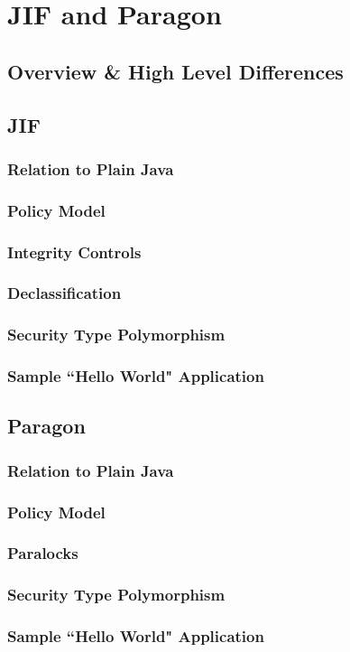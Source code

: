 \chapter{JIF and Paragon} \label{intro_to_jif_para}

\section{Overview \& High Level Differences}

\section{JIF}

\subsection{Relation to Plain Java}

\subsection{Policy Model}

\subsection{Integrity Controls}

\subsection{Declassification}

\subsection{Security Type Polymorphism}

\subsection{Sample ``Hello World" Application}

\section{Paragon}

\subsection{Relation to Plain Java}

\subsection{Policy Model}

\subsection{Paralocks}

\subsection{Security Type Polymorphism}

\subsection{Sample ``Hello World" Application}